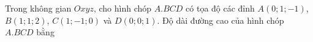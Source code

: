\begin{ex}
Trong không gian $Oxyz$, cho hình chóp $A.BCD$ có tọa độ các đỉnh $A(0;1;-1)$, $B(1;1;2)$, $C(1;-1;0)$ và $D(0;0;1)$. Độ dài đường cao của hình chóp $A.BCD$ bằng
\end{ex}
